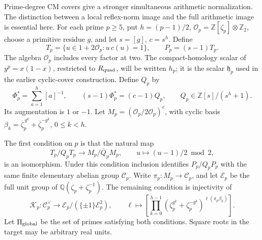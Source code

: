 Prime-degree CM covers give a stronger simultaneous arithmetic
normalization. The distinction between a local reflex-norm image and
the full arithmetic image is essential here.
For each prime \(p\ge5\), put \(h=(p-1)/2\),
\(\mathcal O_p=\mathbb Z[\zeta_p]\otimes\mathbb Z_2\), choose a primitive
residue \(g\), and let \(s=[g]\), \(c=s^h\). Define
\[
 T_p=\{u\in1+2\mathcal O_p:u\,c(u)=1\},\qquad
 P_p=(s-1)T_p.
\]
The algebra \(\mathcal O_p\) includes every factor at two.
The compact-homology scalar of \(y^p=x(1-x)\), restricted to
\(R_{\rm quad}\), will be written \(h_p\); it is the scalar
\(\mathfrak h_p\) used in the earlier cyclic-cover construction.
Define \(Q_p\) by
\[
 \Phi_p^*=\sum_{a=1}^h[a]^{-1},\qquad
 (s-1)\Phi_p^*=(c-1)Q_p,\qquad
 Q_p\in\mathbb Z[s]/(s^h+1).
\]
Its augmentation is \(1\) or \(-1\). Let
\(M_p=(\mathcal O_p/2\mathcal O_p)^c\), with cyclic basis
\(\beta_k=\overline\zeta_p^{\,g^k}+\overline\zeta_p^{-g^k}\),
\(0\le k<h\).

The first condition on \(p\) is that the natural map
\[
 T_p/Q_pT_p\longrightarrow M_p/\overline Q_pM_p,\qquad
 u\longmapsto(u-1)/2\bmod2,
\]
is an isomorphism. Under this condition inclusion identifies
\(P_p/Q_pP_p\) with the same finite elementary abelian group
\(\mathscr C_p\). Write \(\pi_p:M_p\to\mathscr C_p\), and let
\(\mathscr E_p\) be the full unit group of
\(\mathbb Q(\zeta_p+\zeta_p^{-1})\).
The remaining condition is injectivity of
\[
 \mathscr K_p:\mathscr C_p^\vee
       \longrightarrow\mathscr E_p/(\{\pm1\}\mathscr E_p^2),
 \qquad
 \ell\longmapsto
 \left[\prod_{k=0}^{h-1}
   (\zeta_p^{g^k}+\zeta_p^{-g^k})^{\ell(\pi_p\beta_k)}\right].
\]
Let \(\Pi_{\rm global}\) be the set of primes satisfying both
conditions. Square roots in the target may be arbitrary real units.

